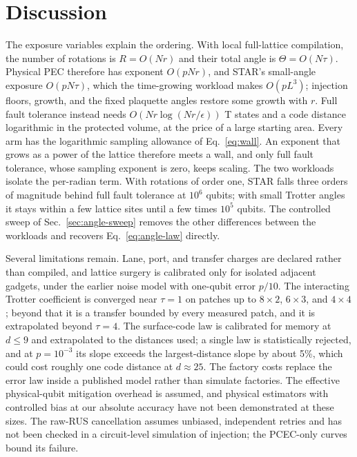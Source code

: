 \documentclass[11pt]{article}
\newcommand{\eps}{\epsilon}
\begin{document}
\section{Discussion}\label{sec:outlook}
The exposure variables explain the ordering. With local full-lattice
compilation, the number of rotations is $R=O(Nr)$ and their total angle is
$\Theta=O(N\tau)$. Physical PEC therefore has exponent $O(pNr)$, and STAR's
small-angle exposure $O(pN\tau)$, which the time-growing workload makes
$O(pL^3)$; injection floors, growth, and the fixed plaquette angles restore
some growth with $r$. Full fault tolerance instead needs $O(Nr\log(Nr/\eps))$
T states and a code distance logarithmic in the protected volume, at the price
of a large starting area. Every arm has the logarithmic sampling allowance of
Eq.~\eqref{eq:wall}. An exponent that grows as a power of the lattice
therefore meets a wall, and only full fault tolerance, whose sampling exponent
is zero, keeps scaling. The two workloads isolate the per-radian term. With
rotations of order one, STAR falls three orders of magnitude behind full fault
tolerance at $10^6$ qubits; with small Trotter angles it stays within a few
lattice sites until a few times $10^5$ qubits. The controlled sweep of
Sec.~\ref{sec:angle-sweep} removes the other differences between the workloads
and recovers Eq.~\eqref{eq:angle-law} directly.

Several limitations remain. Lane, port, and transfer charges are declared
rather than compiled, and lattice surgery is calibrated only for isolated
adjacent gadgets, under the earlier noise model with one-qubit error $p/10$. The interacting Trotter coefficient is converged near
$\tau=1$ on patches up to $8\times2$, $6\times3$, and $4\times4$; beyond that it is a
transfer bounded by every measured patch, and it is extrapolated beyond
$\tau=4$. The surface-code law is calibrated for memory at $d\leq9$ and
extrapolated to the distances used; a single law is statistically rejected, and
at $p=10^{-3}$ its slope exceeds the largest-distance slope by about 5\%, which
could cost roughly one code distance at $d\approx25$. The factory costs replace the error law
inside a published model rather than simulate factories. The effective physical-qubit mitigation
overhead is assumed, and physical estimators with controlled bias at our
absolute accuracy have not been demonstrated at these sizes. The raw-RUS
cancellation assumes unbiased, independent retries and has not been checked in
a circuit-level simulation of injection; the PCEC-only curves bound its failure.
\end{document}
